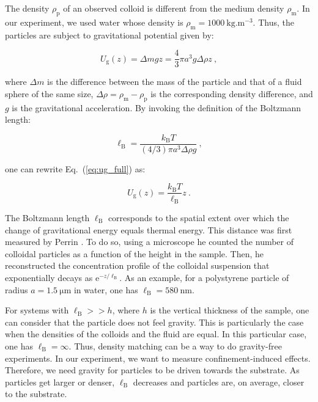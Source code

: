 The density $\rho_\mathrm{p}$ of an observed colloid is different from the medium density $\rho_\mathrm{m}$. In our experiment, we used water whose density is $\rho_\mathrm{m} = 1000 ~ \mathrm{kg.m^{-3}}$. Thus, the particles are subject to gravitational potential given by:

\begin{equation}
	U_\mathrm{g} (z) = \Delta m g z = \frac{4}{3}\pi a ^3 g \Delta \rho z ~,
	\label{eq:ug_full}
\end{equation}

where $\Delta m$ is the difference between the mass of the particle and that of a fluid sphere of the same size, $\Delta \rho = \rho_\mathrm{m} - \rho_\mathrm{p}$ is the corresponding density difference, and $g$ is the gravitational acceleration. By invoking the definition of the Boltzmann length:

\begin{equation}
	\ell _\mathrm{B} = \frac{k_\mathrm{B}T}{(4/3) \pi a ^3 \Delta \rho g } ~,
\end{equation}

one can rewrite Eq.~(\ref{eq:ug_full}) as:

\begin{equation}
	U_\mathrm{g}(z) = \frac{k_\mathrm{B}T}{\ell _\mathrm{B}}z ~.
	\label{eq:ug}
\end{equation}

The Boltzmann length $\ell_\mathrm{B}$ corresponds to the spatial extent over which the change of gravitational energy equals thermal energy. This distance was first measured by Perrin \cite{perrin_les_2014}. To do so, using a microscope he counted the number of colloidal particles as a function of the height in the sample. Then, he reconstructed the concentration profile of the colloidal suspension that exponentially decays as $\mathrm{e}^{- z / \ell _\mathrm{B}}$. As an example, for a polystyrene particle of radius $a  = 1.5 ~ \mathrm{\mu m}$ in water, one has $\ell _\mathrm{B} = 580 ~ \mathrm{nm}$.

For systems with $\ell _\mathrm{B} >> h $, where $h$ is the vertical thickness of the sample, one can consider that the particle does not feel gravity. This is particularly the case when the densities of the colloids and the fluid are equal. In this particular case, one has $\ell _\mathrm{B} = \infty$. Thus, density matching can be a way to do gravity-free experiments. In our experiment, we want to measure confinement-induced effects. Therefore, we need gravity for particles to be driven towards the substrate. As particles get larger or denser, $\ell _\mathrm{B}$ decreases and particles are, on average, closer to the substrate. 


